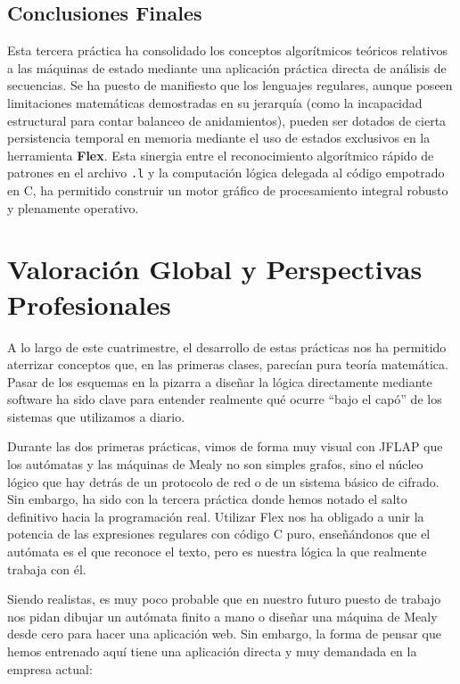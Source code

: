 \documentclass[12pt,a4paper]{article}
\begin{document}
\subsection{Conclusiones Finales}
Esta tercera práctica ha consolidado los conceptos algorítmicos teóricos relativos a las máquinas de estado mediante una aplicación práctica directa de análisis de secuencias. Se ha puesto de manifiesto que los lenguajes regulares, aunque poseen limitaciones matemáticas demostradas en su jerarquía (como la incapacidad estructural para contar balanceo de anidamientos), pueden ser dotados de cierta persistencia temporal en memoria mediante el uso de estados exclusivos en la herramienta \textbf{Flex}. Esta sinergia entre el reconocimiento algorítmico rápido de patrones en el archivo \texttt{.l} y la computación lógica delegada al código empotrado en C, ha permitido construir un motor gráfico de procesamiento integral robusto y plenamente operativo.

\newpage

\section{Valoración Global y Perspectivas Profesionales}

A lo largo de este cuatrimestre, el desarrollo de estas prácticas nos ha permitido aterrizar conceptos que, en las primeras clases, parecían pura teoría matemática. Pasar de los esquemas en la pizarra a diseñar la lógica directamente mediante software ha sido clave para entender realmente qué ocurre ``bajo el capó'' de los sistemas que utilizamos a diario. 

Durante las dos primeras prácticas, vimos de forma muy visual con JFLAP que los autómatas y las máquinas de Mealy no son simples grafos, sino el núcleo lógico que hay detrás de un protocolo de red o de un sistema básico de cifrado. Sin embargo, ha sido con la tercera práctica donde hemos notado el salto definitivo hacia la programación real. Utilizar Flex nos ha obligado a unir la potencia de las expresiones regulares con código C puro, enseñándonos que el autómata es el que reconoce el texto, pero es nuestra lógica la que realmente trabaja con él.

Siendo realistas, es muy poco probable que en nuestro futuro puesto de trabajo nos pidan dibujar un autómata finito a mano o diseñar una máquina de Mealy desde cero para hacer una aplicación web. Sin embargo, la forma de pensar que hemos entrenado aquí tiene una aplicación directa y muy demandada en la empresa actual:
\end{document}
